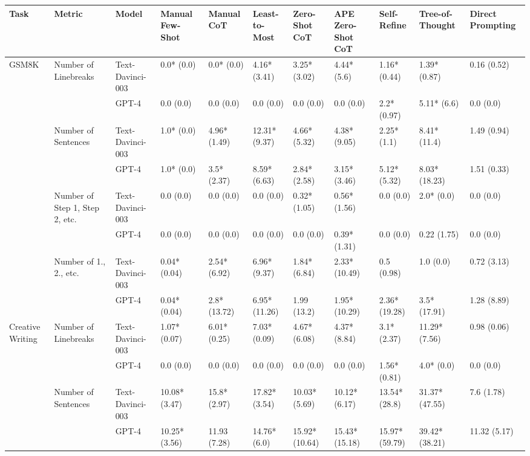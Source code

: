 \begin{tabular}{x{0.75cm}|x{1.5cm}|x{0.75cm}|x{0.75cm}|x{0.75cm}|x{0.75cm}|x{0.75cm}|x{0.75cm}|x{0.75cm}|x{0.75cm}|x{0.75cm}}
\toprule
\hline
Task & Metric & Model & Manual Few-Shot & Manual CoT & Least-to-Most & Zero-Shot CoT & APE Zero-Shot CoT & Self-Refine & Tree-of-Thought & Direct Prompting \\
\hline
\midrule
GSM8K & Number of Linebreaks & Text-Davinci-003 & 0.0* (0.0) & 0.0* (0.0) & 4.16* (3.41) & 3.25* (3.02) & 4.44* (5.6) & 1.16* (0.44) & 1.39* (0.87) & 0.16 (0.52) \\
\hline
 &  & GPT-4 & 0.0 (0.0) & 0.0 (0.0) & 0.0 (0.0) & 0.0 (0.0) & 0.0 (0.0) & 2.2* (0.97) & 5.11* (6.6) & 0.0 (0.0) \\
\hline
 & Number of Sentences & Text-Davinci-003 & 1.0* (0.0) & 4.96* (1.49) & 12.31* (9.37) & 4.66* (5.32) & 4.38* (9.05) & 2.25* (1.1) & 8.41* (11.4) & 1.49 (0.94) \\
\hline
 &  & GPT-4 & 1.0* (0.0) & 3.5* (2.37) & 8.59* (6.63) & 2.84* (2.58) & 3.15* (3.46) & 5.12* (5.32) & 8.03* (18.23) & 1.51 (0.33) \\
\hline
 & Number of Step 1, Step 2, etc. & Text-Davinci-003 & 0.0 (0.0) & 0.0 (0.0) & 0.0 (0.0) & 0.32* (1.05) & 0.56* (1.56) & 0.0 (0.0) & 2.0* (0.0) & 0.0 (0.0) \\
\hline
 &  & GPT-4 & 0.0 (0.0) & 0.0 (0.0) & 0.0 (0.0) & 0.0 (0.0) & 0.39* (1.31) & 0.0 (0.0) & 0.22 (1.75) & 0.0 (0.0) \\
\hline
 & Number of 1., 2., etc. & Text-Davinci-003 & 0.04* (0.04) & 2.54* (6.92) & 6.96* (9.37) & 1.84* (6.84) & 2.33* (10.49) & 0.5 (0.98) & 1.0 (0.0) & 0.72 (3.13) \\
\hline
 &  & GPT-4 & 0.04* (0.04) & 2.8* (13.72) & 6.95* (11.26) & 1.99 (13.2) & 1.95* (10.29) & 2.36* (19.28) & 3.5* (17.91) & 1.28 (8.89) \\
\hline
Creative Writing & Number of Linebreaks & Text-Davinci-003 & 1.07* (0.07) & 6.01* (0.25) & 7.03* (0.09) & 4.67* (6.08) & 4.37* (8.84) & 3.1* (2.37) & 11.29* (7.56) & 0.98 (0.06) \\
\hline
 &  & GPT-4 & 0.0 (0.0) & 0.0 (0.0) & 0.0 (0.0) & 0.0 (0.0) & 0.0 (0.0) & 1.56* (0.81) & 4.0* (0.0) & 0.0 (0.0) \\
\hline
 & Number of Sentences & Text-Davinci-003 & 10.08* (3.47) & 15.8* (2.97) & 17.82* (3.54) & 10.03* (5.69) & 10.12* (6.17) & 13.54* (28.8) & 31.37* (47.55) & 7.6 (1.78) \\
\hline
 &  & GPT-4 & 10.25* (3.56) & 11.93 (7.28) & 14.76* (6.0) & 15.92* (10.64) & 15.43* (15.18) & 15.97* (59.79) & 39.42* (38.21) & 11.32 (5.17) \\

\end{tabular}
